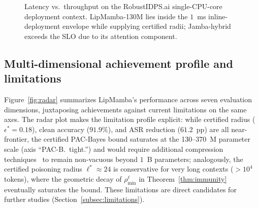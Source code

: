 \documentclass[journal,a4paper,10pt]{IEEEtran}
\theoremstyle{definition}
\theoremstyle{remark}
\newcommand{\modelname}{LipMamba}
\begin{document}
\begin{figure}[!t]
\centering
{}
\caption{Latency vs.\ throughput on the RobustIDPS.ai single-CPU-core deployment context. \modelname{}-130M lies inside the $1$~ms inline-deployment envelope while supplying certified radii; Jamba-hybrid exceeds the SLO due to its attention component.}
\label{fig:latency}
\end{figure}

\subsection{Multi-dimensional achievement profile and limitations}

Figure~\ref{fig:radar} summarizes \modelname{}'s performance across seven evaluation dimensions, juxtaposing achievements against current limitations on the same axes. The radar plot makes the limitation profile explicit: while certified radius ($\epsilon^* = 0.18$), clean accuracy ($91.9\%$), and ASR reduction ($61.2$~pp) are all near-frontier, the certified PAC-Bayes bound saturates at the 130--370~M parameter scale (axis ``PAC-B.\ tight.'') and would require additional compression techniques~\cite{lotfi2024nonvacuous} to remain non-vacuous beyond $1$~B parameters; analogously, the certified poisoning radius $\ell^* \approx 24$ is conservative for very long contexts ($> 10^4$ tokens), where the geometric decay of $\rho_{\min}^\ell$ in Theorem~\ref{thm:immunity} eventually saturates the bound. These limitations are direct candidates for further studies (Section~\ref{subsec:limitations}).
\end{document}
